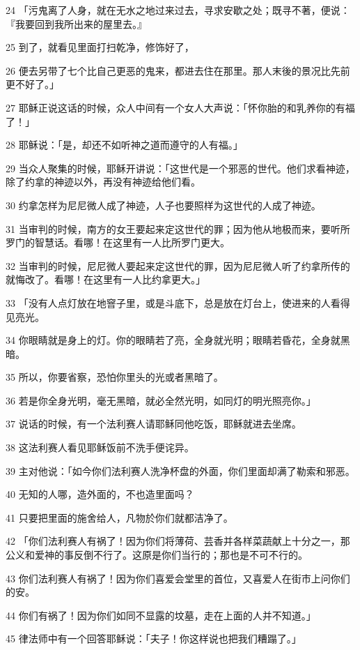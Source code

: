 \par 24 「污鬼离了人身，就在无水之地过来过去，寻求安歇之处；既寻不著，便说：『我要回到我所出来的屋里去。』
\par 25 到了，就看见里面打扫乾净，修饰好了，
\par 26 便去另带了七个比自己更恶的鬼来，都进去住在那里。那人末後的景况比先前更不好了。」
\par 27 耶稣正说这话的时候，众人中间有一个女人大声说：「怀你胎的和乳养你的有福了！」
\par 28 耶稣说：「是，却还不如听神之道而遵守的人有福。」
\par 29 当众人聚集的时候，耶稣开讲说：「这世代是一个邪恶的世代。他们求看神迹，除了约拿的神迹以外，再没有神迹给他们看。
\par 30 约拿怎样为尼尼微人成了神迹，人子也要照样为这世代的人成了神迹。
\par 31 当审判的时候，南方的女王要起来定这世代的罪；因为他从地极而来，要听所罗门的智慧话。看哪！在这里有一人比所罗门更大。
\par 32 当审判的时候，尼尼微人要起来定这世代的罪，因为尼尼微人听了约拿所传的就悔改了。看哪！在这里有一人比约拿更大。」
\par 33 「没有人点灯放在地窨子里，或是斗底下，总是放在灯台上，使进来的人看得见亮光。
\par 34 你眼睛就是身上的灯。你的眼睛若了亮，全身就光明；眼睛若昏花，全身就黑暗。
\par 35 所以，你要省察，恐怕你里头的光或者黑暗了。
\par 36 若是你全身光明，毫无黑暗，就必全然光明，如同灯的明光照亮你。」
\par 37 说话的时候，有一个法利赛人请耶稣同他吃饭，耶稣就进去坐席。
\par 38 这法利赛人看见耶稣饭前不洗手便诧异。
\par 39 主对他说：「如今你们法利赛人洗净杯盘的外面，你们里面却满了勒索和邪恶。
\par 40 无知的人哪，造外面的，不也造里面吗？
\par 41 只要把里面的施舍给人，凡物於你们就都洁净了。
\par 42 「你们法利赛人有祸了！因为你们将薄荷、芸香并各样菜蔬献上十分之一，那公义和爱神的事反倒不行了。这原是你们当行的；那也是不可不行的。
\par 43 你们法利赛人有祸了！因为你们喜爱会堂里的首位，又喜爱人在街市上问你们的安。
\par 44 你们有祸了！因为你们如同不显露的坟墓，走在上面的人并不知道。」
\par 45 律法师中有一个回答耶稣说：「夫子！你这样说也把我们糟蹋了。」
